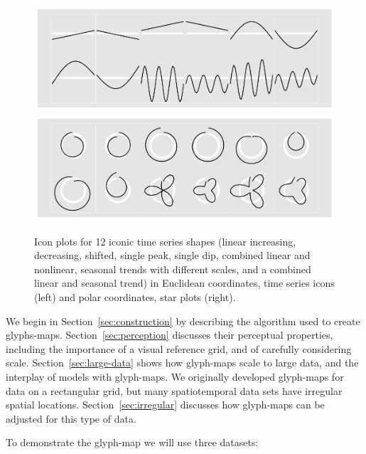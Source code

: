 \documentclass[oneside]{article}
\begin{document}
\begin{figure}[htbp]
  \centering
  \includegraphics[width=0.5\linewidth]{euclid-to-polar-1}%
  \includegraphics[width=0.5\linewidth]{euclid-to-polar-2}

  \caption{Icon plots for 12 iconic time series shapes (linear increasing, decreasing, shifted, single peak, single dip, combined linear and nonlinear, seasonal trends with different scales, and a combined linear and seasonal trend) in Euclidean coordinates, time series icons (left) and polar coordinates, star plots (right).}
  \label{fig:templates}
\end{figure}



We begin in Section~\ref{sec:construction} by describing the algorithm used to create glyphs-maps. Section~\ref{sec:perception} discusses their perceptual properties, including the importance of a visual reference grid, and of carefully considering scale. Section~\ref{sec:large-data} shows how glyph-maps scale to large data, and the interplay of models with glyph-maps. We originally developed glyph-maps for data on a rectangular grid, but many spatiotemporal data sets have irregular spatial locations. Section~\ref{sec:irregular} discusses how glyph-maps can be adjusted for this type of data.

To demonstrate the glyph-map we will use three datasets:
\end{document}
